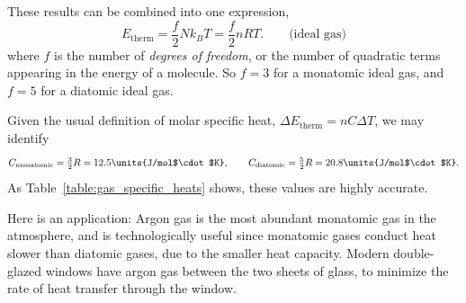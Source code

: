 These results can be combined into one expression,
\begin{equation}
E_\text{therm} = \frac{f}{2} Nk_BT = \frac{f}{2} nRT.\qquad\text{(ideal gas)}
\label{eq:EthermIdealGas}
\end{equation}
where $f$ is the number of {\it degrees of freedom}, or the number of quadratic terms appearing in the energy of a molecule.  So $f=3$ for a monatomic
ideal gas, and $f=5$ for a diatomic ideal gas.

Given the usual definition of molar specific heat, $\Delta E_\text{therm}
= n C\Delta T$, we may identify
\begin{equation}
C_\text{monatomic} = {\textstyle\frac{3}{2}R} = 12.5\units{J/mol$\cdot$K}, 
\qquad
C_\text{diatomic} = {\textstyle\frac{5}{2}R} = 20.8\units{J/mol$\cdot$K}.
\end{equation}
As Table~\ref{table:gas_specific_heats} shows, these values are highly
accurate. 

\begin{table}
\begin{center}


\caption{Molar specific heats (at constant volume) of selected gases.}
\label{table:gas_specific_heats}
\end{center}
\end{table}

Here is an application:
Argon gas is the most abundant monatomic gas in the atmosphere, and is
technologically useful since monatomic gases conduct heat slower than
diatomic gases, due to the smaller heat capacity.  
Modern double-glazed windows have argon gas between the two
sheets of glass, to minimize the rate of heat transfer through the
window.

